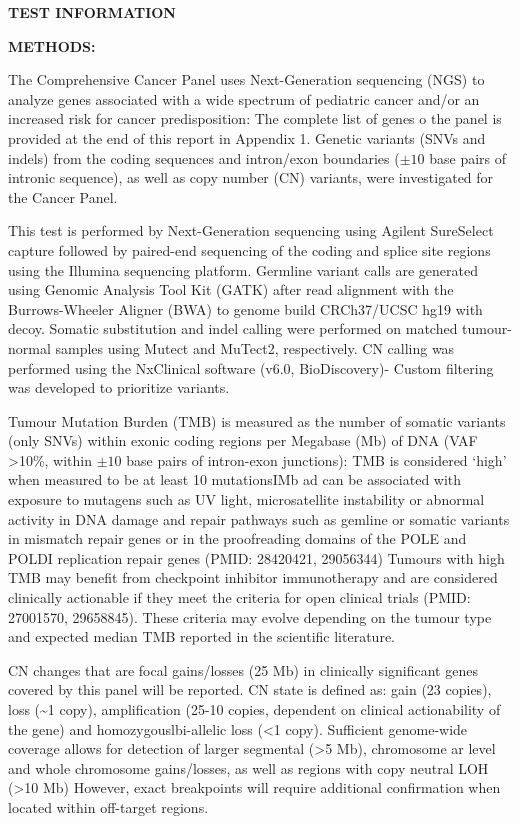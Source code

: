 \documentclass[8pt,letterpaper]{extarticle}
\newcommand{\data}[1]{}
\begin{document}
\vspace{2em}
{\small
{\bf TEST INFORMATION}

{\bf METHODS:}

The Comprehensive Cancer Panel uses Next-Generation sequencing (NGS) to analyze \data{num_tested_genes} genes associated with a wide spectrum of pediatric cancer and/or an increased risk for cancer predisposition: The complete list of genes o the panel is provided at the end of this report in Appendix 1. Genetic variants (SNVs and indels) from the coding sequences and intron/exon boundaries ($\pm 10$ base pairs of intronic sequence), as well as copy number (CN) variants, were investigated for the Cancer Panel.

This test is performed by Next-Generation sequencing using Agilent SureSelect capture followed by paired-end sequencing of the coding and splice site regions using the Illumina sequencing platform. Germline variant calls are generated using Genomic Analysis Tool Kit (GATK) after read alignment with the Burrows-Wheeler Aligner (BWA) to genome build CRCh37/UCSC hg19 with decoy. Somatic substitution and indel calling were performed on matched tumour-normal samples using Mutect and MuTect2, respectively. CN calling was performed using the NxClinical software (v6.0, BioDiscovery)- Custom filtering was developed to prioritize variants. 

Tumour Mutation Burden (TMB) is measured as the number of somatic variants (only SNVs) within exonic coding regions per Megabase (Mb) of DNA (VAF >10\%, within $\pm 10$ base pairs of intron-exon junctions): TMB is considered `high' when measured to be at least 10 mutationsIMb ad can be associated with exposure to mutagens such as UV light, microsatellite instability or abnormal activity in DNA damage and repair pathways such as gemline or somatic variants in mismatch repair genes or in the proofreading domains of the POLE and POLDI replication repair genes (PMID: 28420421, 29056344) Tumours with high TMB may benefit from checkpoint inhibitor immunotherapy and are considered clinically actionable if they meet the criteria for open clinical trials (PMID: 27001570, 29658845). These criteria may evolve depending on the tumour type and expected median TMB reported in the scientific literature.

CN changes that are focal gains/losses (25 Mb) in clinically significant genes covered by this panel will be reported. CN state is defined as: gain (23 copies), loss (\textasciitilde 1 copy), amplification (25-10 copies, dependent on clinical actionability of the gene) and homozygouslbi-allelic loss (<1 copy). Sufficient genome-wide coverage allows for detection of larger segmental (>5 Mb), chromosome ar level and whole chromosome gains/losses, as well as regions with copy neutral LOH (>10 Mb)  However, exact breakpoints will require additional confirmation when located within off-target regions.

}
\end{document}
